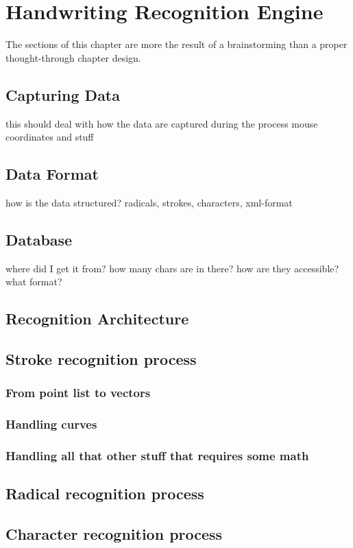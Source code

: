 \chapter{Handwriting Recognition Engine}
The sections of this chapter are more the result of a brainstorming 
than a  proper thought-through chapter design.

\section{Capturing Data}
this should deal with how the data are captured during the process
mouse coordinates and stuff

\section{Data Format}
how is the data structured? radicals, strokes, characters, xml-format

\section{Database}
where did I get it from? how many chars are in there?
how are they accessible? what format?

\section{Recognition Architecture}

\section{Stroke recognition process}
\subsection{From point list to vectors}
\subsection{Handling curves}
\subsection{Handling all that other stuff that requires some math}

\section{Radical recognition process}
\section{Character recognition process}

